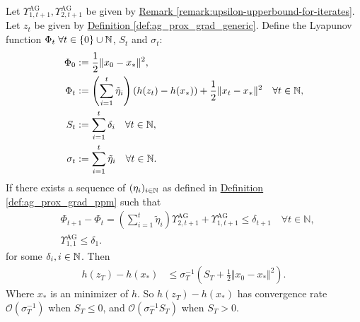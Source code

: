 \documentclass[12pt]{article}
\begin{document}
    \begin{theorem}
    \label{thm:generic_ag_convergence}
        Let $\Upsilon_{1, t + 1}^\text{AG}, \Upsilon_{2, t + 1}^\text{AG}$ be given by 
        \hyperref[remark:upsilon-upperbound-for-iterates]
        {Remark \ref*{remark:upsilon-upperbound-for-iterates}}. 
        Let $z_t$ be given by 
        \hyperref[def:ag_prox_grad_generic]
        {Definition \ref*{def:ag_prox_grad_generic}}. 
        Define the Lyapunov function $\Phi_t\; \forall t \in \{0\}\cup \mathbb N$, $S_t$ and $\sigma_t$: 
        \begin{align*}
            \Phi_0 &:= \frac{1}{2}\Vert x_0 - x_*\Vert^2, 
            \\
            \Phi_t &:= \left(
                \sum_{i = 1}^{t} \tilde\eta_{i}
            \right) (h(z_t) - h(x_*)) + \frac{1}{2}\Vert x_t - x_*\Vert^2 \quad \forall t \in \mathbb N,
            \\
            S_t &:= \sum_{i = 1}^{t} \delta_i \quad \forall t \in \mathbb N,
            \\
            \sigma_t &:= \sum_{i = 1}^{t}\tilde \eta_i \quad \forall t \in \mathbb N. 
        \end{align*}
        If there exists a sequence of $(\eta_i)_{i \in \mathbb N}$ as defined in
        \hyperref[def:ag_prox_grad_ppm]
        {Definition \ref*{def:ag_prox_grad_ppm}} 
        such that
        \begin{align*}
            & \Phi_{t + 1} - \Phi_{t} =
            \left(
                \sum_{i = 1}^{t} \tilde \eta_i
            \right)\Upsilon_{2, t + 1}^{\text{AG}} 
            + 
            \Upsilon_{1, t + 1}^{\text{AG}} 
            \le \delta_{t + 1} \quad 
            \forall t \in \mathbb N, 
            \\
            & \Upsilon_{1, 1}^{\text{AG}} \le \delta_1. 
        \end{align*}
        for some $\delta_i, i \in \mathbb N$. 
        Then
        \begin{align*}
            h(z_T) - h(x_*) &\le 
            \sigma_T^{-1}\left(
                S_{T} + \frac{1}{2}\Vert x_0 - x_*\Vert^2
            \right). 
        \end{align*}
        Where $x_*$ is an minimizer of $h$. 
        So $h(z_T) - h(x_*)$ has convergence rate $\mathcal O(\sigma_T^{-1})$ when $S_T \le 0$, and $\mathcal O(\sigma_T^{-1}S_T)$ when $S_T > 0$. 
    \end{theorem}
\end{document}
